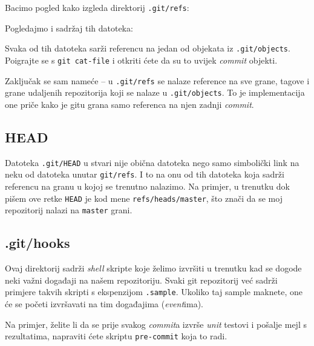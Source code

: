 Bacimo pogled kako izgleda direktorij \verb+.git/refs+:



Pogledajmo i sadržaj tih datoteka:



Svaka od tih datoteka sarži referencu na jedan od objekata iz \verb+.git/objects+. 
Poigrajte se s \verb+git cat-file+ i otkriti ćete da su to uvijek \emph{commit} objekti.

Zaključak se sam nameće -- u \verb+.git/refs+ se nalaze reference na sve grane, tagove i grane udaljenih repozitorija koji se nalaze u \verb+.git/objects+.
To je implementacija one priče kako je gitu grana samo referenca na njen zadnji \emph{commit}.

\subsection*{HEAD}

Datoteka \verb+.git/HEAD+ u stvari nije obična datoteka nego samo simbolički link na neku od datoteka unutar \verb+git/refs+.
I to na onu od tih datoteka koja sadrži referencu na granu u kojoj se trenutno nalazimo.
Na primjer, u trenutku dok pišem ove retke \verb+HEAD+ je kod mene \verb+refs/heads/master+, što znači da se moj repozitorij nalazi na \verb+master+ grani.

\subsection*{.git/hooks}

Ovaj direktorij sadrži \emph{shell} skripte koje želimo izvršiti u trenutku kad se dogode neki važni događaji na našem repozitoriju.
Svaki git repozitorij već sadrži primjere takvih skripti s ekspenzijom \verb+.sample+.
Ukoliko taj sample maknete, one će se početi izvršavati na tim događajima (\emph{event}ima).

Na primjer, želite li da se prije svakog \emph{commit}a izvrše \emph{unit} testovi i pošalje mejl s rezultatima, napraviti ćete skriptu \verb+pre-commit+ koja to radi.


